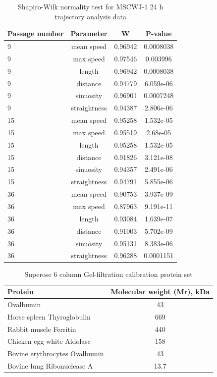 \documentclass[num-refs]{wiley-article}
\begin{document}
\begin{table}[hbt!]
  \caption{Shapiro-Wilk normality test for MSCWJ-1 24 h trajectory analysis data}
\centering
\begin{tabular}{l|ccc}
    \hline
 Passage number & Parameter & W & P-value \\
   \hline
9 & mean speed & 0.96942 & 0.0008038 \\
9 & max speed & 0.97546 &  0.003996 \\
9 & length & 0.96942 & 0.0008038 \\
9 & distance & 0.94779 & 6.059e-06 \\
9 & sinuosity & 0.96901 & 0.0007248 \\
9 & straightness & 0.94387 & 2.806e-06 \\
15 & mean speed & 0.95258 & 1.532e-05 \\
15 & max speed & 0.95519 &  2.68e-05 \\
15 & length & 0.95258 & 1.532e-05 \\
15 & distance & 0.91826 & 3.121e-08 \\
15 & sinuosity & 0.94357 & 2.491e-06 \\
15 & straightness & 0.94791 & 5.855e-06 \\
36 & mean speed & 0.90753 & 3.937e-09 \\
36 & max speed & 0.87963 &  9.191e-11 \\
36 & length & 0.93084 & 1.639e-07 \\
36 & distance & 0.91003 & 5.702e-09 \\
36 & sinuosity & 0.95131 & 8.383e-06 \\
36 & straightness & 0.96288 & 0.0001151
\end{tabular}
\end{table}

\begin{table}[hbt!]
  \caption{Superose 6 column Gel-filtration calibration protein set}
\centering
\begin{tabular}{l|c|}
 Protein & Molecular weight (Mr), kDa  \\
 \hline
 Ovalbumin & 43 \\
 Horse spleen Thyroglobulin & 669 \\
 Rabbit muscle Ferritin & 440 \\
 Chicken egg white Aldolase & 158 \\
 Bovine erythrocytes Ovalbumin & 43 \\
 Bovine lung Ribonuclease A & 13.7
\end{tabular}
\begin{tablenotes}
\end{tablenotes}
\end{table}
\end{document}

